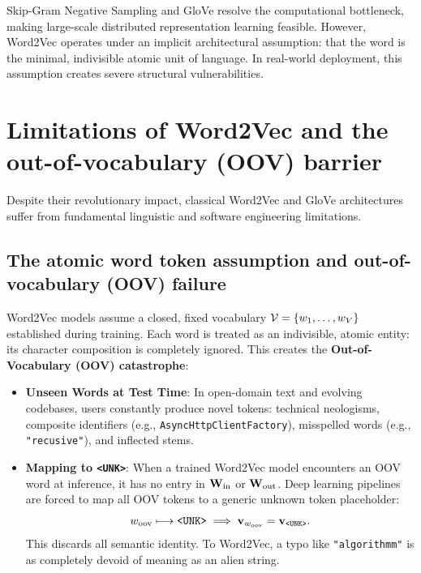 \documentclass[../../main.tex]{subfiles}
\begin{document}
Skip-Gram Negative Sampling and GloVe resolve the computational bottleneck, making large-scale distributed representation learning feasible. However, Word2Vec operates under an implicit architectural assumption: that the word is the minimal, indivisible atomic unit of language. In real-world deployment, this assumption creates severe structural vulnerabilities.

\section{Limitations of Word2Vec and the out-of-vocabulary (OOV) barrier}
\label{sec:word2vec_limitations}

Despite their revolutionary impact, classical Word2Vec and GloVe architectures suffer from fundamental linguistic and software engineering limitations.

\subsection{The atomic word token assumption and out-of-vocabulary (OOV) failure}
\label{subsec:oov_barrier}

Word2Vec models assume a closed, fixed vocabulary $\mathcal{V} = \{w_1, \dots, w_V\}$ established during training. Each word is treated as an indivisible, atomic entity: its character composition is completely ignored. This creates the \textbf{Out-of-Vocabulary (OOV) catastrophe}:
\begin{itemize}
    \item \textbf{Unseen Words at Test Time}: In open-domain text and evolving codebases, users constantly produce novel tokens: technical neologisms, composite identifiers (e.g., \texttt{AsyncHttpClientFactory}), misspelled words (e.g., \texttt{"recusive"}), and inflected stems.
    \item \textbf{Mapping to \texttt{<UNK>}}: When a trained Word2Vec model encounters an OOV word at inference, it has no entry in $\mathbf{W}_{\text{in}}$ or $\mathbf{W}_{\text{out}}$. Deep learning pipelines are forced to map all OOV tokens to a generic unknown token placeholder:
    \begin{equation}
    \label{eq:unk_collapse}
    w_{\text{oov}} \longmapsto \text{\texttt{<UNK>}} \implies \mathbf{v}_{w_{\text{oov}}} = \mathbf{v}_{\text{\texttt{<UNK>}}}.
    \end{equation}
    This discards all semantic identity. To Word2Vec, a typo like \texttt{"algorithmm"} is as completely devoid of meaning as an alien string.
\end{itemize}
\end{document}
